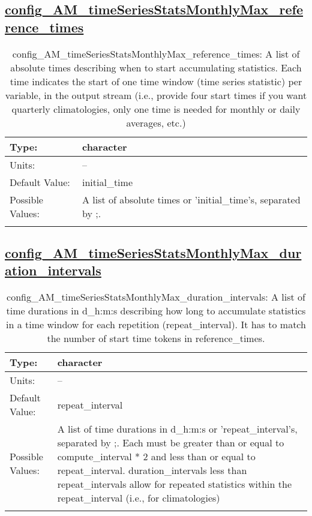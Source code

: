 \subsection[config\_AM\_timeSeriesStatsMonthlyMax\_reference\_times]{\hyperref[sec:nm_tab_AM_timeSeriesStatsMonthlyMax]{config\_AM\_timeSeriesStatsMonthlyMax\_reference\_times}}
\label{subsec:nm_sec_config_AM_timeSeriesStatsMonthlyMax_reference_times}
\begin{center}
\begin{longtable}{| p{2.0in} || p{4.0in} |}
    \hline
    Type: & character \\
    \hline
    Units: & -- \\
    \hline
    Default Value: & initial\_time \\
    \hline
    Possible Values: & A list of absolute times or 'initial\_time's, separated by ;. \\
    \hline
    \caption{config\_AM\_timeSeriesStatsMonthlyMax\_reference\_times: A list of absolute times describing when to start accumulating statistics. Each time indicates the start of one time window (time series statistic) per variable, in the output stream (i.e., provide four start times if you want quarterly climatologies, only one time is needed for monthly or daily averages, etc.)}
\end{longtable}
\end{center}
\subsection[config\_AM\_timeSeriesStatsMonthlyMax\_duration\_intervals]{\hyperref[sec:nm_tab_AM_timeSeriesStatsMonthlyMax]{config\_AM\_timeSeriesStatsMonthlyMax\_duration\_intervals}}
\label{subsec:nm_sec_config_AM_timeSeriesStatsMonthlyMax_duration_intervals}
\begin{center}
\begin{longtable}{| p{2.0in} || p{4.0in} |}
    \hline
    Type: & character \\
    \hline
    Units: & -- \\
    \hline
    Default Value: & repeat\_interval \\
    \hline
    Possible Values: & A list of time durations in d\_h:m:s or 'repeat\_interval's, separated by ;. Each must be greater than or equal to compute\_interval * 2 and less than or equal to repeat\_interval. duration\_intervals less than repeat\_intervals allow for repeated statistics within the repeat\_interval (i.e., for climatologies) \\
    \hline
    \caption{config\_AM\_timeSeriesStatsMonthlyMax\_duration\_intervals: A list of time durations in d\_h:m:s describing how long to accumulate statistics in a time window for each repetition (repeat\_interval). It has to match the number of start time tokens in reference\_times.}
\end{longtable}
\end{center}
